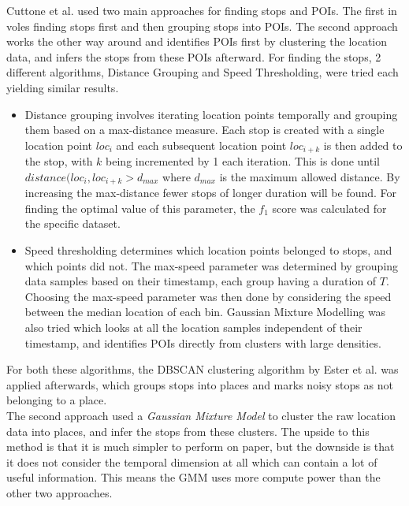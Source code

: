 Cuttone et al. used two main approaches for finding stops and POIs. The first in voles finding stops first and then grouping stops into POIs. The second approach works the other way around and identifies POIs first by clustering the location data, and infers the stops from these POIs afterward. For finding the stops, 2 different algorithms, Distance Grouping and Speed Thresholding, were tried each yielding similar results.

\begin{itemize}
    \item Distance grouping involves iterating location points temporally and grouping them based on a max-distance measure. Each stop is created with a single location point $loc_{i}$ and each subsequent location point $loc_{i+k}$ is then added to the stop, with $k$ being incremented by 1 each iteration. This is done until $distance(loc_{i}, loc_{i+k} > d_{max}$ where $d_{max}$ is the maximum allowed distance. By increasing the max-distance fewer stops of longer duration will be found. For finding the optimal value of this parameter, the $f_1$ score was calculated for the specific dataset.  

    \item Speed thresholding determines which location points belonged to stops, and which points did not. The max-speed parameter was determined by grouping data samples based on their timestamp, each group having a duration of $T$. Choosing the max-speed parameter was then done by considering the speed between the median location of each bin. Gaussian Mixture Modelling was also tried which looks at all the location samples independent of their timestamp, and identifies POIs directly from clusters with large densities. 
\end{itemize}

For both these algorithms, the DBSCAN clustering algorithm by Ester et al. \cite{density-based-1996} was applied afterwards, which groups stops into places and marks noisy stops as not belonging to a place.\\

The second approach used a \textit{Gaussian Mixture Model} to cluster the raw location data into places, and infer the stops from these clusters. The upside to this method is that it is much simpler to perform on paper, but the downside is that it does not consider the temporal dimension at all which can contain a lot of useful information. This means the GMM uses more compute power than the other two approaches. \\

